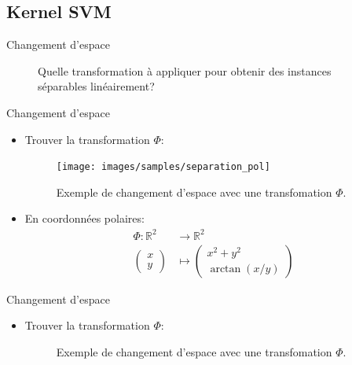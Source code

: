 \documentclass[8pt]{beamer}
\begin{document}
	\subsection[kernel]{Kernel SVM}

	\begin{frame}{Changement d'espace}
		\begin{figure}[H]
			\begin{center}
				
				\caption*{\label{fig::circles_3} Quelle transformation à appliquer pour obtenir des instances séparables linéairement?}
			\end{center}
		\end{figure}
	\end{frame}
	\begin{frame}[plain]{Changement d'espace}
		\begin{itemize}
			\item  Trouver la transformation $\Phi$:
			\begin{figure}[H]
				\texttt{[image: images/samples/separation\_pol]}
				\caption*{\label{fig::kernel_polar} Exemple de changement d'espace avec une transfomation $\Phi$.}
			\end{figure}
			\item En coordonnées polaires:
			\begin{align*}
				\Phi: \mathbb{R}^2 &\rightarrow \mathbb{R}^2 \\
				\begin{pmatrix}
					x \\
					y
				\end{pmatrix} &\mapsto \begin{pmatrix}
					x^2 + y^2 \\
					\arctan(x/y)
				\end{pmatrix}
			\end{align*}
		\end{itemize}
	\end{frame}
	\begin{frame}{Changement d'espace}
		\begin{itemize}
			\item  Trouver la transformation $\Phi$:
			\begin{figure}[H]
				{
					\caption*{  Exemple de changement d'espace avec une transfomation $\Phi$.}
				}
			\end{figure}
		\end{itemize}
	\end{frame}
\end{document}
